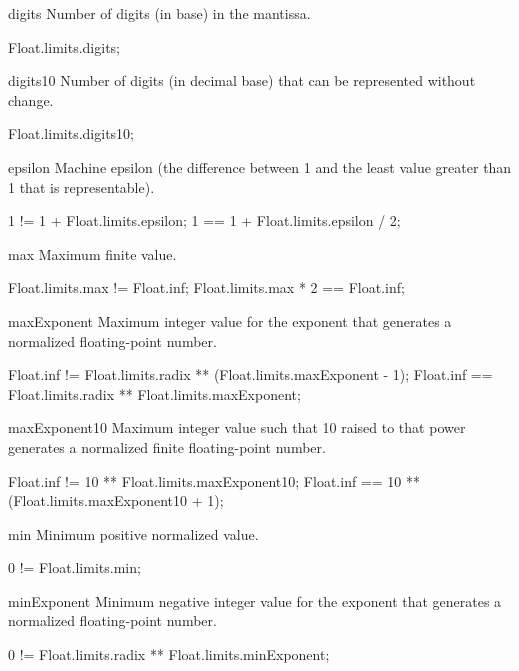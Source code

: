 \begin{urbiscriptapi}
\item[digits] Number of digits (in  base) in the mantissa.
\begin{urbiassert}
Float.limits.digits;
\end{urbiassert}

\item[digits10]
  Number of digits (in decimal base) that can be represented without
  change.
\begin{urbiassert}
Float.limits.digits10;
\end{urbiassert}

\item[epsilon]
  Machine epsilon (the difference between 1 and the least value
  greater than 1 that is representable).
\begin{urbiassert}
1 != 1 + Float.limits.epsilon;
1 == 1 + Float.limits.epsilon / 2;
\end{urbiassert}

\item[max]
  Maximum finite value.
\begin{urbiassert}
Float.limits.max     != Float.inf;
Float.limits.max * 2 == Float.inf;
\end{urbiassert}

\item[maxExponent]
  Maximum integer value for the exponent that generates a normalized
  floating-point number.
\begin{urbiassert}
Float.inf != Float.limits.radix ** (Float.limits.maxExponent - 1);
Float.inf == Float.limits.radix ** Float.limits.maxExponent;
\end{urbiassert}

\item[maxExponent10]
  Maximum integer value such that 10 raised to that power generates a
  normalized finite floating-point number.
\begin{urbiassert}
Float.inf != 10 ** Float.limits.maxExponent10;
Float.inf == 10 ** (Float.limits.maxExponent10 + 1);
\end{urbiassert}

\item[min]
  Minimum positive normalized value.
\begin{urbiassert}
0 != Float.limits.min;
\end{urbiassert}

\item[minExponent]
  Minimum negative integer value for the exponent that generates a
  normalized floating-point number.
\begin{urbiassert}
0 != Float.limits.radix ** Float.limits.minExponent;
\end{urbiassert}


\end{urbiscriptapi}
